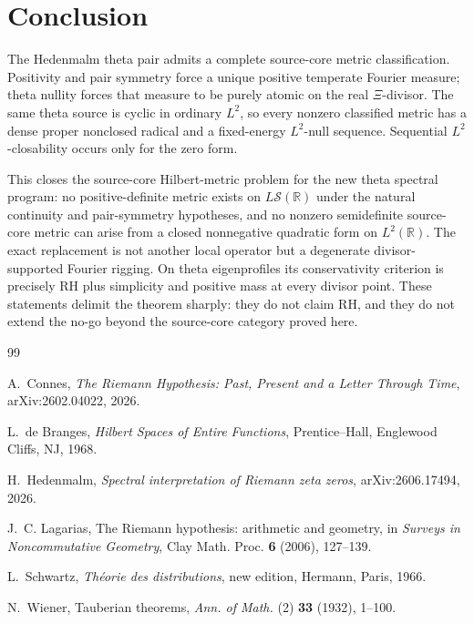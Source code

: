 \documentclass[11pt]{article}
\newcommand{\R}{\mathbb R}
\newcommand{\cS}{\mathcal S}
\begin{document}
\section{Conclusion}

The Hedenmalm theta pair admits a complete source-core metric classification.  Positivity and pair
symmetry force a unique positive temperate Fourier measure; theta nullity forces that measure to be
purely atomic on the real \(\Xi\)-divisor.  The same theta source is cyclic in ordinary \(L^2\), so
every nonzero classified metric has a dense proper nonclosed radical and a fixed-energy
\(L^2\)-null sequence.  Sequential \(L^2\)-closability occurs only for the zero form.

This closes the source-core Hilbert-metric problem for the new theta spectral program:
no positive-definite metric exists on \(L\cS(\R)\) under the natural continuity and pair-symmetry
hypotheses, and no nonzero semidefinite source-core metric can arise from a closed nonnegative
quadratic form on \(L^2(\R)\).  The exact replacement is not another local operator but a
degenerate divisor-supported Fourier rigging.  On theta eigenprofiles its conservativity criterion is
precisely RH plus simplicity and positive mass at every divisor point.  These statements delimit
the theorem sharply: they do not claim RH, and they do not extend the no-go beyond the
source-core category proved here.

\begin{thebibliography}{99}

A.~Connes,
\emph{The Riemann Hypothesis: Past, Present and a Letter Through Time},
arXiv:2602.04022, 2026.

L.~de Branges,
\emph{Hilbert Spaces of Entire Functions},
Prentice--Hall, Englewood Cliffs, NJ, 1968.

H.~Hedenmalm,
\emph{Spectral interpretation of Riemann zeta zeros},
arXiv:2606.17494, 2026.

J.~C. Lagarias,
The Riemann hypothesis: arithmetic and geometry,
in \emph{Surveys in Noncommutative Geometry},
Clay Math. Proc. \textbf{6} (2006), 127--139.

L.~Schwartz,
\emph{Th\'eorie des distributions},
new edition, Hermann, Paris, 1966.

N.~Wiener,
Tauberian theorems,
\emph{Ann. of Math.} (2) \textbf{33} (1932), 1--100.

\end{thebibliography}
\end{document}
